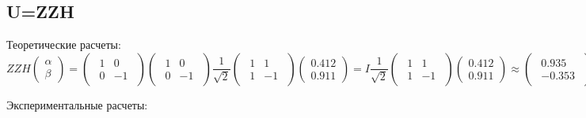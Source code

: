 \documentclass{article}
\begin{document}
\subsection{U=ZZH}

Теоретические расчеты:
\begin{equation}
  ZZH\begin{pmatrix} \alpha\\ \beta \end{pmatrix} =
  \begin{pmatrix}\begin{array}{rr} 1 & 0 \\ 0 & -1 \end{array}
  \end{pmatrix}\begin{pmatrix}\begin{array}{rr} 1 & 0 \\ 0 & -1 \end{array}
  \end{pmatrix}\frac{1}{\sqrt{2}}\begin{pmatrix}\begin{array}{rr} 1 & 1 \\ 1 &
  -1 \end{array} \end{pmatrix}\begin{pmatrix} 0.412 \\ 0.911
  \end{pmatrix}=I\frac{1}{\sqrt{2}}\begin{pmatrix} \begin{array}{rr}1 & 1 \\
  1 & -1 \end{array}\end{pmatrix}\begin{pmatrix} 0.412 \\ 0.911
  \end{pmatrix}\approx\begin{pmatrix} \begin{array}{r}0.935\\-0.353
  \end{array}\end{pmatrix}
\end{equation}

 Экспериментальные расчеты:

 \begin{figure}[H]
\end{figure}
\end{document}
